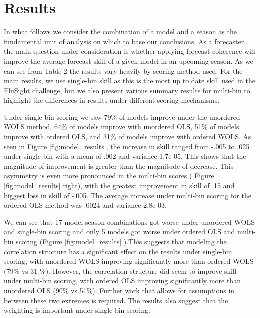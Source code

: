 \documentclass{umassthesis}          %
\begin{document}
\section{Results}

	In what follows we consider the combination of a model and a season as the fundamental unit of analysis on which to base our conclusions. As a forecaster, the main question under consideration is whether applying forecast coherence will improve the average forecast skill of a given model in an upcoming season. As we can see from Table 2 the results vary heavily by scoring method used. For the main results, we use single-bin skill as this is the most up to date skill used in the FluSight challenge, but we also present various summary results for multi-bin to highlight the differences in results under different scoring mechanisms. 

Under single-bin scoring we saw 79\% of models improve under the unordered WOLS method, 64\% of models improve with unordered OLS, 51\% of models improve with ordered OLS, and 31\% of models improve with ordered WOLS. As seen in Figure \ref{fig:model_results}, the increase in skill ranged from -.005 to .025 under single-bin with a mean of .002 and variance 1.7e-05. This shows that the magnitude of improvement is greater than the magnitude of decrease. This asymmetry is even more pronounced in the multi-bin scores ( Figure \ref{fig:model_results} right), with the greatest improvement in skill of .15 and biggest loss in skill of -.005. The average increase under multi-bin scoring for the ordered OLS method was .0024 and variance 2.8e-03.  

We can see that 17 model season combinations got worse under unordered WOLS and single-bin scoring and only 5 models got worse under ordered OLS and multi-bin scoring (Figure   \ref{fig:model_results} ).This suggests that modeling the correlation structure has a significant effect on the results under single-bin scoring, with unordered WOLS improving significantly more than ordered WOLS (79\% vs 31 \%).  However, the correlation structure did seem to improve skill under multi-bin scoring, with ordered OLS improving significantly more than unordered OLS (90\% vs 51\%). Further work that allows for assumptions in between these two extremes is required. The results also suggest that the weighting is important under single-bin scoring. 
\end{document}
